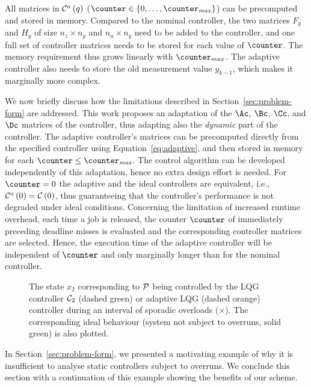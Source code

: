 All matrices in $\mathcal{C}^a\left( q \right)$ ($\counter \in \{0, \ldots, \counter_\mathit{max}\}$) can be precomputed and stored in memory.
Compared to the nominal controller, the two matrices $F_y$ and $H_y$ of size $n_z \times n_y$ and $n_u \times n_y$ need to be added to the controller, and one full set of controller matrices needs to be stored for each value of $\counter$.
The memory requirement thus grows linearly with $\counter_{max}$.
The adaptive controller also needs to store the old measurement value $y_{k-1}$, which makes it marginally more complex.

We now briefly discuss how the limitations described in Section~\ref{sec:problem-form} are addressed.
This work proposes an adaptation of the $\Ac$, $\Bc$, $\Cc$, and $\Dc$ matrices of the controller, thus adapting also the \emph{dynamic} part of the controller.
The adaptive controller's matrices can be precomputed directly from the specified controller using Equation~\eqref{eq:adaptive}, and then stored in memory for each $\counter \leq \counter_\mathit{max}$.
The control algorithm can be developed independently of this adaptation, hence no extra design effort is needed.
For $\counter=0$ the adaptive and the ideal controllers are equivalent, i.e., $\mathcal{C}^a\left( 0 \right) = \mathcal{C}\left( 0 \right)$, thus guaranteeing that the controller's performance is not degraded under ideal conditions.
Concerning the limitation of increased runtime overhead, each time a job is released, the counter $\counter$ of immediately preceding deadline misses is evaluated and the corresponding controller matrices are selected.
Hence, the execution time of the adaptive controller will be independent of $\counter$ and only marginally longer than for the nominal controller.

\begin{figure}[tp!]
    \centerline{}
    \caption{The state $x_2$ corresponding to $\mathcal{P}$ being controlled by the LQG controller $\mathcal{C}_2$ (dashed green) or adaptive LQG (dashed orange) controller during an interval of sporadic overloads ($\times$).
        The corresponding ideal behaviour (system not subject to overruns, solid green) is also plotted.}
    \label{fig:lqgs-lqgd}
\end{figure}

In Section~\ref{sec:problem-form}, we presented a motivating example of why it is insufficient to analyse static controllers subject to overruns.
We conclude this section with a continuation of this example showing the benefits of our scheme.

